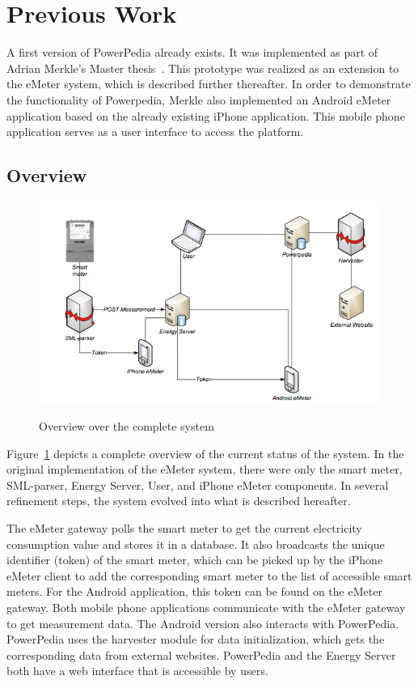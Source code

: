 \section{Previous Work} \label{sec:previous_work}
A first version of PowerPedia already exists. It was implemented as part of Adrian Merkle's Master thesis~\cite{merklepp}. This prototype was realized as an extension to the eMeter system, which is described further thereafter.
In order to demonstrate the functionality of Powerpedia, Merkle also implemented an Android eMeter application based on the already existing iPhone application. This mobile phone application serves as a user interface to access the platform.

\subsection{Overview}
\begin{center}
\begin{figure}
 \includegraphics[width=15cm]{Images/emeter_overview.png}
 \label{emeter_overview}
 \caption{Overview over the complete system}
\end{figure}
\end{center}
Figure~\ref{emeter_overview} depicts a complete overview of the current status of the system. In the original implementation of the eMeter system, there were only the smart meter, SML-parser, Energy Server, User, and iPhone eMeter components. In several refinement steps, the system evolved into what is described hereafter. 

The eMeter gateway polls the smart meter to get the current electricity consumption value and stores it in a database. It also broadcasts the unique identifier (token) of the smart meter, which can be picked up by the iPhone eMeter client to add the corresponding smart meter to the list of accessible smart meters. For the Android application, this token can be found on the eMeter gateway. Both mobile phone applications communicate with the eMeter gateway to get measurement data. The Android version also interacts with PowerPedia. PowerPedia uses the harvester module for data initialization, which gets the corresponding data from external websites. 
PowerPedia and the Energy Server both have a web interface that is accessible by users.    

